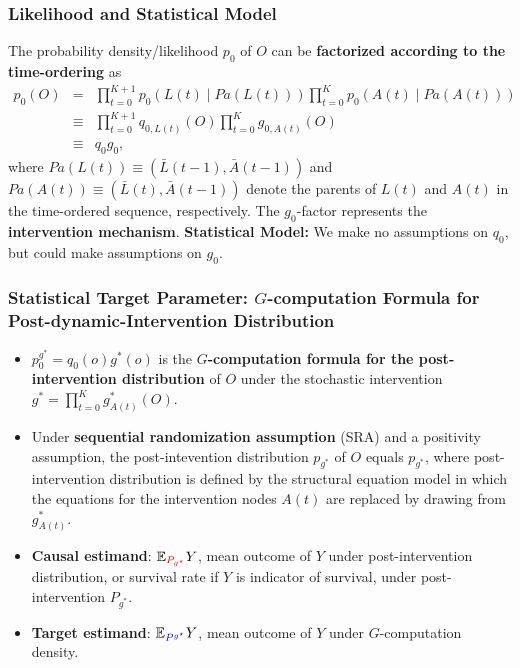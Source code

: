 \documentclass[t]{beamer}
\begin{document}
\begin{frame}
\frametitle{Likelihood and Statistical Model}
The probability density/likelihood $p_0$ of $O$ can be {\bf factorized according to the time-ordering} as
\begin{eqnarray*}
p_0(O)&=&\prod_{t=0}^{K+1} p_0(L(t)\mid Pa(L(t)) ) \prod_{t=0}^K p_0(A(t)\mid Pa(A(t)) )\\
&\equiv& \prod_{t=0}^{K+1}q_{0,L(t)}(O)\prod_{t=0}^K g_{0,A(t)}(O)\\
&\equiv& q_0g_0,
\end{eqnarray*}
where $Pa(L(t))\equiv (\bar{L}(t-1),\bar{A}(t-1))$ and $Pa(A(t))\equiv (\bar{L}(t),\bar{A}(t-1))$ denote the parents  of $L(t)$ and $A(t)$ in the time-ordered sequence, respectively.
The $g_0$-factor represents the {\bf intervention mechanism}.\newline
{\bf Statistical Model:}
We make no assumptions on $q_0$, but could make assumptions on $g_0$.
\end{frame}


\begin{frame}
\frametitle{Statistical Target Parameter: $G$-computation Formula for Post-dynamic-Intervention Distribution}
\begin{itemize}
\item $p^{g^*}_0=q_0(o)g^*(o)$ is the {\bf $G$-computation formula for the post-intervention distribution} of $O$ under the stochastic intervention $g^*=\prod_{t=0}^K g^*_{A(t)}(O)$.
\item Under {\bf sequential randomization assumption} (SRA) and a positivity assumption, the post-intevention distribution $p_{g^*}$ of $O$ equals $p_{g^*}$, where post-intervention distribution is defined by the structural equation model in which the equations for the intervention nodes $A(t)$ are replaced by drawing from $g^*_{A(t)}$.
\item {\bf Causal estimand}: $\mathbb{E}_{\textcolor{red}{P_{g^{\star}}}}Y$, mean outcome of $Y$ under post-intervention distribution, or survival rate if $Y$ is indicator of survival, under  post-intervention $P_{g^*}$.
\item {\bf Target estimand}: $\mathbb{E}_{\textcolor{blue}{P^{g^{\star}}}}Y$, mean outcome of $Y$ under $G$-computation density.
\end{itemize}
\end{frame}
\end{document}
